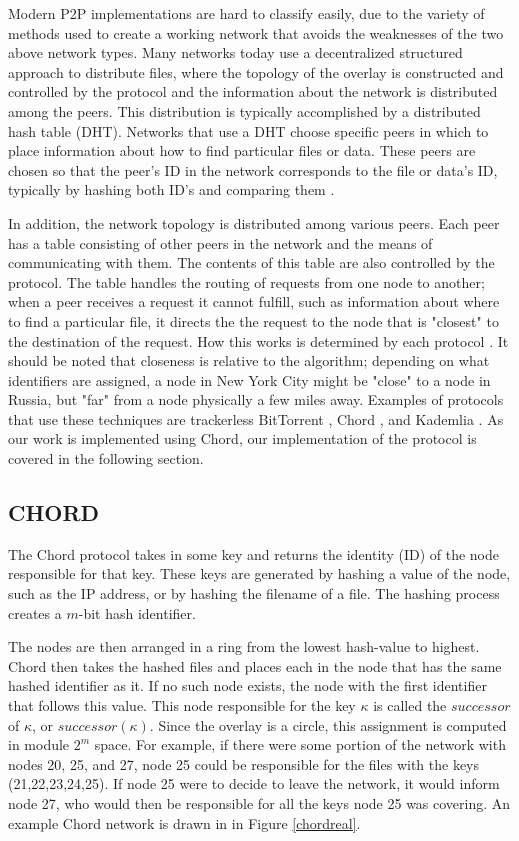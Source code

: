 \documentclass[conference, compsocconf, letterpaper]{IEEEtran}
\begin{document}
Modern P2P implementations are hard to classify easily, due to the variety of methods used to create a working network that avoids the weaknesses of the two above network types.  Many networks today use a decentralized structured approach to distribute files, where the topology of the overlay is constructed and controlled by the protocol and the information about the network is distributed among the peers.  This distribution is typically accomplished by a distributed hash table (DHT).  Networks that use a DHT choose specific peers in which to place information about how to find particular files or data.  These peers are chosen so that the peer's ID in the network corresponds to the file or data's ID, typically by hashing both ID's and comparing them  \cite{SurveyCompare}. 

In addition, the network topology is distributed among various peers.  Each peer has a table consisting of other peers in the network and the means of communicating with them.  The contents of this table are also controlled by the protocol.  The table handles the routing of requests from one node to another; when a peer receives a request it cannot fulfill, such as information about where to find a particular file, it directs the the request to the node that is "closest" to the destination of the request. How this works is determined by each protocol \cite{Chord}.  It should be noted that closeness is relative to the algorithm; depending on what identifiers are assigned, a node in New York City might be "close" to a node in Russia, but "far" from a node physically a few miles away.  Examples of protocols that use these techniques are trackerless BitTorrent \cite{BitTorrent}, Chord \cite{Chord}, and Kademlia \cite{Kademlia}.  As our work is implemented using Chord, our implementation of the protocol is covered in the following section. 






\subsection{CHORD}
The Chord protocol \cite{Chord} takes in some key and returns the identity (ID) of the node responsible for that key.  These keys are generated by hashing a value of the node, such as the IP address, or by hashing  the filename of a file.  The hashing process creates a $m$-bit hash identifier.

The nodes are then arranged in a ring from the lowest hash-value to highest.  Chord then takes the hashed files and places each in the node that has the same hashed identifier as it.  If no such node exists, the node with the first identifier that follows this value.  This node responsible for the key $\kappa$ is called the $successor$ of $\kappa$, or $successor(\kappa)$.  Since the overlay is a circle, this assignment is computed in module $2^m$ space.  For example, if there were some portion of the network with nodes 20, 25, and 27, node 25 could be responsible for the files with the keys (21,22,23,24,25). If node 25 were to decide to leave the network, it would inform node 27, who would then be responsible for all the keys node 25 was covering. An example Chord network is drawn in in Figure \ref{chordreal}.
\end{document}

